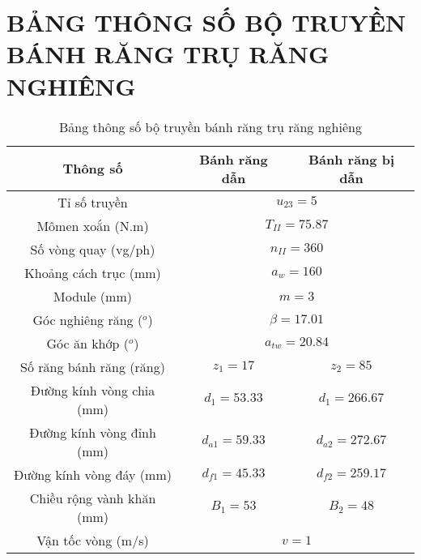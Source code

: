     \section{BẢNG THÔNG SỐ BỘ TRUYỀN BÁNH RĂNG TRỤ RĂNG NGHIÊNG}
        \begin{table}[H]
            \centering
            \begin{tabular}{|c|c|c|}
                \hline
                \textbf{Thông số} & \textbf{Bánh răng dẫn} & \textbf{Bánh răng bị dẫn} \\ \hline
                Tỉ số truyền & \multicolumn{2}{c|}{$u_{23} = 5$} \\ \hline
                Mômen xoắn (N.m) & \multicolumn{2}{c|}{$T_{II} = 75.87$} \\ \hline
                Số vòng quay (vg/ph) & \multicolumn{2}{c|}{$n_{II} = 360$} \\ \hline
                Khoảng cách trục (mm) & \multicolumn{2}{c|}{$a_w = 160$} \\ \hline
                Module (mm) & \multicolumn{2}{c|}{$m = 3$} \\ \hline
                Góc nghiêng răng ($^o$) & \multicolumn{2}{c|}{$\beta = 17.01$} \\ \hline
                Góc ăn khớp ($^o$)& \multicolumn{2}{c|}{$a_{tw} = 20.84$} \\ \hline
                Số răng bánh răng (răng) & $z_1 = 17$ & $z_2 = 85$ \\ \hline
                Đường kính vòng chia (mm) & $d_1 = 53.33$ &  $d_1 = 266.67$ \\ \hline
                Đường kính vòng đỉnh (mm) & $d_{a1} = 59.33$ &  $d_{a2} = 272.67$ \\ \hline
                Đường kính vòng đáy (mm) & $d_{f1} = 45.33$ &  $d_{f2} = 259.17$ \\ \hline
                Chiều rộng vành khăn (mm) & $B_1 = 53$ & $B_2 = 48$ \\ \hline
                Vận tốc vòng (m/s) & \multicolumn{2}{c|}{$v = 1$} \\ \hline
            \end{tabular}
            \caption{Bảng thông số bộ truyền bánh răng trụ răng nghiêng}
        \end{table}

            